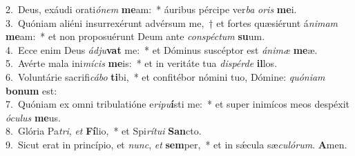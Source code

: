 {2.~}Deus, exáudi orati\textit{ó}\textit{nem} \textbf{me}am:~* áuribus pércipe ver\textit{ba} \textit{o}\textit{ris} \textbf{me}i.\\
{3.~}Quóniam aliéni insurrexérunt advérsum me,~† et fortes quæsiérunt á\textit{ni}\textit{mam} \textbf{me}am:~* et non proposuérunt Deum ante \textit{con}\textit{spé}\textit{ctum} \textbf{su}um.\\
{4.~}Ecce enim Deus \textit{ád}\textit{ju}\textbf{vat} me:~* et Dóminus suscéptor est \textit{á}\textit{ni}\textit{mæ} \textbf{me}æ.\\
{5.~}Avérte mala ini\textit{mí}\textit{cis} \textbf{me}is:~* et in veritáte tua \textit{di}\textit{spér}\textit{de} \textbf{il}los.\\
{6.~}Voluntárie sacrifi\textit{cá}\textit{bo} \textbf{ti}bi,~* et confitébor nómini tuo, Dómine: \textit{quó}\textit{ni}\textit{am} \textbf{bo}\textbf{num} est:\\
{7.~}Quóniam ex omni tribulatióne e\textit{ri}\textit{pu}\textbf{í}sti me:~* et super inimícos meos despéxit \textit{ó}\textit{cu}\textit{lus} \textbf{me}us.\\
{8.~}Glória Pa\textit{tri}, \textit{et} \textbf{Fí}lio,~* et Spi\textit{rí}\textit{tu}\textit{i} \textbf{San}cto.\\
{9.~}Sicut erat in princípio, et \textit{nunc}, \textit{et} \textbf{sem}per,~* et in sǽcula sæ\textit{cu}\textit{ló}\textit{rum}. \textbf{A}men.\\
